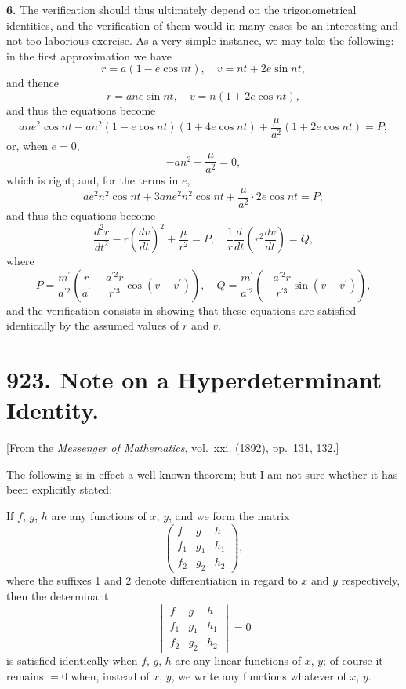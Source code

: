 \documentclass[12pt,a4paper]{article}
\begin{document}
\textbf{6.} The verification should thus ultimately depend on the trigonometrical
identities, and the verification of them would in many cases be an interesting and
not too laborious exercise. As a very simple instance, we may take the following:
in the first approximation we have
\[
r = a(1 - e\cos nt), \quad v = nt + 2e\sin nt,
\]
and thence
\[
\dot{r} = ane\sin nt, \quad \dot{v} = n(1 + 2e\cos nt),
\]
and thus the equations become
\[
ane^2\cos nt - an^2(1 - e\cos nt)(1 + 4e\cos nt) + \frac{\mu}{a^2}(1 + 2e\cos nt) = P;
\]
or, when $e = 0$,
\[
-an^2 + \frac{\mu}{a^2} = 0,
\]
which is right; and, for the terms in $e$,
\[
ae^2n^2\cos nt + 3ane^2n^2\cos nt + \frac{\mu}{a^2}\cdot 2e\cos nt = P;
\]
and thus the equations become
\[
\frac{d^2r}{dt^2} - r\left(\frac{dv}{dt}\right)^2 + \frac{\mu}{r^2} = P, \quad
\frac{1}{r}\frac{d}{dt}\left(r^2\frac{dv}{dt}\right) = Q,
\]
where
\[
P = \frac{m^\prime}{a^{\prime 2}}\left(\frac{r}{a^{\prime}} - \frac{a^{\prime 2}r}{r^{\prime 3}}\cos(v - v^\prime)\right), \quad
Q = \frac{m^\prime}{a^{\prime 2}}\left(-\frac{a^{\prime 2}r}{r^{\prime 3}}\sin(v - v^\prime)\right),
\]
and the verification consists in showing that these equations are satisfied identically
by the assumed values of $r$ and $v$.



\newpage
\section*{923. Note on a Hyperdeterminant Identity.}

[From the \textit{Messenger of Mathematics}, vol.~xxi. (1892), pp.~131, 132.]

\bigskip

The following is in effect a well-known theorem; but I am not sure whether
it has been explicitly stated:

If $f$, $g$, $h$ are any functions of $x$, $y$, and we form the matrix
\[
\begin{pmatrix}
f & g & h\\
f_1 & g_1 & h_1\\
f_2 & g_2 & h_2
\end{pmatrix},
\]
where the suffixes 1 and 2 denote differentiation in regard to $x$ and $y$ respectively,
then the determinant
\[
\begin{vmatrix}
f & g & h\\
f_1 & g_1 & h_1\\
f_2 & g_2 & h_2
\end{vmatrix}
= 0
\]
is satisfied identically when $f$, $g$, $h$ are any linear functions of $x$, $y$; of course it
remains $=0$ when, instead of $x$, $y$, we write any functions whatever of $x$, $y$.
\end{document}
